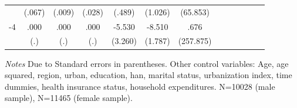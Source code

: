 \begin{table}[p]
\begin{adjustbox}{max width=\linewidth}
\begin{threeparttable}
{\begin{tabular}{l*{6}{SS}}
                &   (.067)         &   (.009)         &   (.028)         &   (.489)         &  (1.026)         & (65.853)         \\
-4             &     .000         &     .000         &     .000         &   -5.530\sym{*}  &   -8.510\sym{***}&     .676         \\
                &      (.)         &      (.)         &      (.)         &  (3.260)         &  (1.787)         &(257.875)         \\    
\bottomrule
\end{tabular}
\begin{tablenotes}
\item \textit{Notes} Due to    Standard errors in parentheses.
Other control variables: Age, age squared, region, urban, education, han, marital status, urbanization index, time dummies, health insurance status, household expenditures.    N=10028 (male sample), N=11465 (female sample).
\end{tablenotes}
}
\end{threeparttable}
\end{adjustbox}
\end{table}

\clearpage

